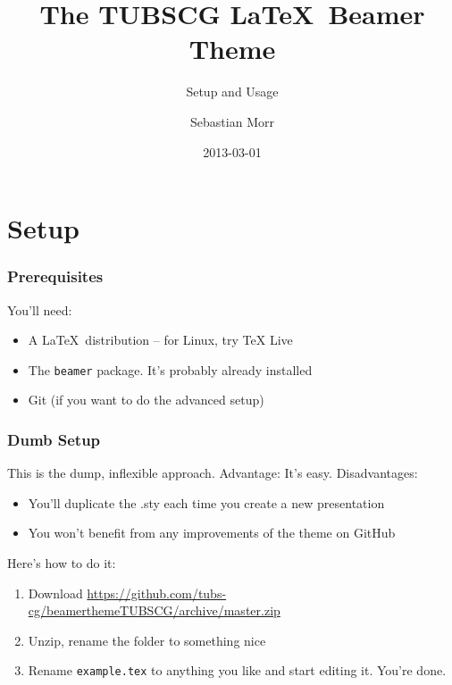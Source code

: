 \documentclass{beamer}
\title[TUBSCG Theme]{The TUBSCG \LaTeX\ Beamer Theme}
\subtitle{Setup and Usage}
\author[S.~Morr]{Sebastian Morr}
\institute{Computer Graphics Lab\\TU Braunschweig}
\date{2013-03-01}
\begin{document}
\begin{frame}
    \titlepage
\end{frame}

\section{Setup}

\begin{frame}
    \frametitle{Prerequisites}

    You'll need:

    \begin{itemize}
        \item A \LaTeX\ distribution -- for Linux, try \alert{TeX Live}
        \item The \texttt{beamer} package. It's probably already installed
        \item Git (if you want to do the advanced setup)
    \end{itemize}
\end{frame}

\begin{frame}
    \frametitle{Dumb Setup}

    This is the dump, inflexible approach. Advantage: It's easy. Disadvantages:

    \begin{itemize}
        \item You'll duplicate the .sty each time you create a new presentation
        \item You won't benefit from any improvements of the theme on GitHub
    \end{itemize}

    Here's how to do it:

    \begin{enumerate}
        \item Download \url{https://github.com/tubs-cg/beamerthemeTUBSCG/archive/master.zip}
        \item Unzip, rename the folder to something nice
        \item Rename \texttt{example.tex} to anything you like and start editing it. You're done.
    \end{enumerate}

\end{frame}
\end{document}
